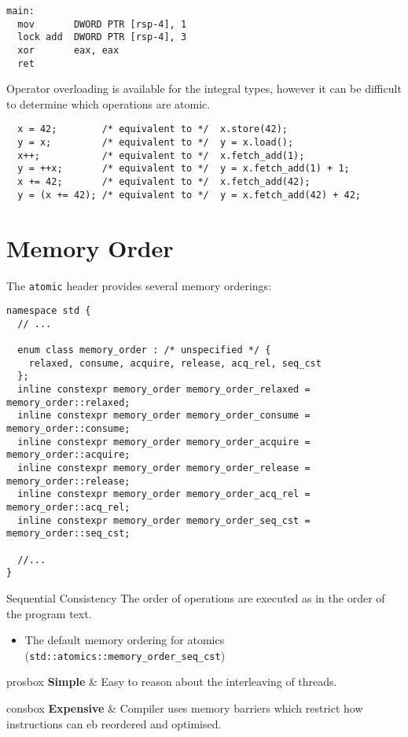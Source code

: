 \hfill
\begin{minipage}{.49\textwidth}
  \begin{verbatim}
main:
  mov       DWORD PTR [rsp-4], 1
  lock add  DWORD PTR [rsp-4], 3
  xor       eax, eax
  ret

  \end{verbatim}
\end{minipage}

Operator overloading is available for the integral types, however it can be difficult to determine which operations are atomic.
\begin{verbatim}
  x = 42;        /* equivalent to */  x.store(42);
  y = x;         /* equivalent to */  y = x.load();
  x++;           /* equivalent to */  x.fetch_add(1);
  y = ++x;       /* equivalent to */  y = x.fetch_add(1) + 1;
  x += 42;       /* equivalent to */  x.fetch_add(42);
  y = (x += 42); /* equivalent to */  y = x.fetch_add(42) + 42;
\end{verbatim}

\section{Memory Order}
The \texttt{atomic} header provides several memory orderings:
\begin{verbatim}
namespace std {
  // ...

  enum class memory_order : /* unspecified */ {
    relaxed, consume, acquire, release, acq_rel, seq_cst
  };
  inline constexpr memory_order memory_order_relaxed = memory_order::relaxed;
  inline constexpr memory_order memory_order_consume = memory_order::consume;
  inline constexpr memory_order memory_order_acquire = memory_order::acquire;
  inline constexpr memory_order memory_order_release = memory_order::release;
  inline constexpr memory_order memory_order_acq_rel = memory_order::acq_rel;
  inline constexpr memory_order memory_order_seq_cst = memory_order::seq_cst;

  //...
}
\end{verbatim}

\begin{definitionbox}{Sequential Consistency}
  The order of operations are executed as in the order of the program text.
  \begin{itemize}
    \item The default memory ordering for atomics (\texttt{std::atomics::memory_order_seq_cst})
  \end{itemize}
  \begin{tabbox}{prosbox}
    \textbf{Simple} & Easy to reason about the interleaving of threads. \\
  \end{tabbox}
  \begin{tabbox}{consbox}
    \textbf{Expensive} & Compiler uses memory barriers which restrict how instructions can eb reordered and optimised. \\
  \end{tabbox}
\end{definitionbox}

